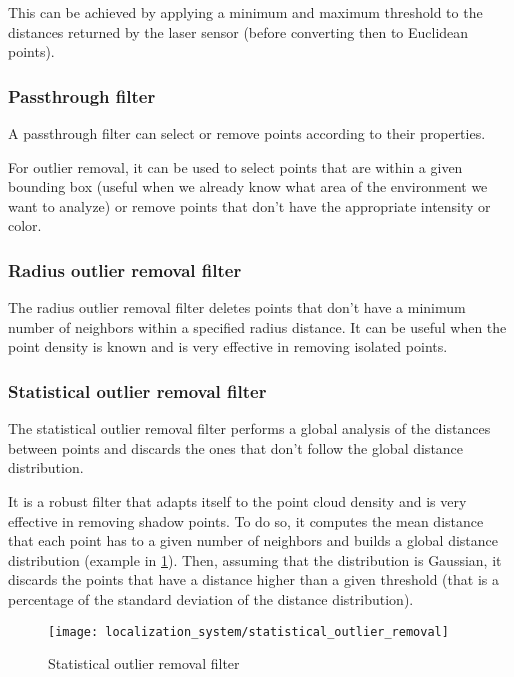 This can be achieved by applying a minimum and maximum threshold to the distances returned by the laser sensor (before converting then to Euclidean points).


\subsubsection{Passthrough filter}

A passthrough filter can select or remove points according to their properties.

For outlier removal, it can be used to select points that are within a given bounding box (useful when we already know what area of the environment we want to analyze) or remove points that don't have the appropriate intensity or color.


\subsubsection{Radius outlier removal filter}

The radius outlier removal filter deletes points that don't have a minimum number of neighbors within a specified radius distance. It can be useful when the point density is known and is very effective in removing isolated points.


\subsubsection{Statistical outlier removal filter}

The statistical outlier removal filter \cite{Rusu2010a} performs a global analysis of the distances between points and discards the ones that don't follow the global distance distribution.

It is a robust filter that adapts itself to the point cloud density and is very effective in removing shadow points. To do so, it computes the mean distance that each point has to a given number of neighbors and builds a global distance distribution (example in \cref{fig:point-cloud-algorithms_statistical-outlier-removal}). Then, assuming that the distribution is Gaussian, it discards the points that have a distance higher than a given threshold (that is a percentage of the standard deviation of the distance distribution).

\begin{figure}[H]
	\centering
	\texttt{[image: localization\_system/statistical\_outlier\_removal]}
	\caption[Statistical outlier removal filter]{Statistical outlier removal filter\protect\footnotemark}
	\label{fig:point-cloud-algorithms_statistical-outlier-removal}
\end{figure}


